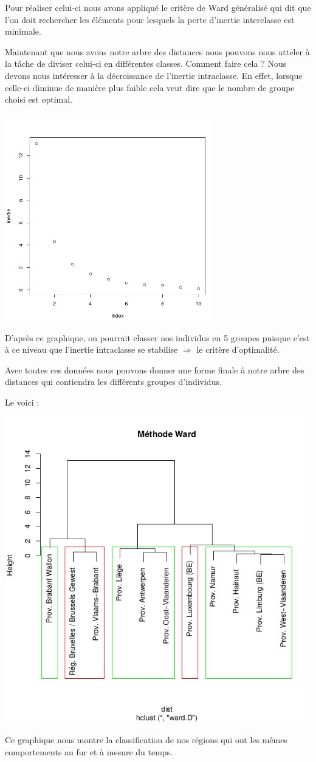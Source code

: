 \documentclass{article}
\begin{document}
Pour réaliser celui-ci nous avons appliqué le critère de Ward généralisé qui dit que l'on doit rechercher les éléments pour lesquels la perte d'inertie interclasse est minimale.


Maintenant que nous avons notre arbre des distances nous pouvons nous atteler à la tâche de diviser celui-ci en différentes classes. Comment faire cela ? Nous devons nous intéresser à la décroissance de l'inertie intraclasse. En effet, lorsque celle-ci diminue de manière plus faible cela veut dire que le nombre de groupe choisi est optimal.

\includegraphics[width=9cm]{Inertie}

D'après ce graphique, on pourrait classer nos individus en 5 groupes puisque c'est à ce niveau que l'inertie intraclasse se stabilise $\Rightarrow$ le critère d'optimalité.

Avec toutes ces données nous pouvons donner une forme finale à notre arbre des distances qui contiendra les différents groupes d'individus.

Le voici : 

\includegraphics[width=\textwidth]{Ward}

Ce graphique nous montre la classification de nos régions qui ont les mêmes comportements au fur et à mesure du temps.
\newpage

\end{document}
